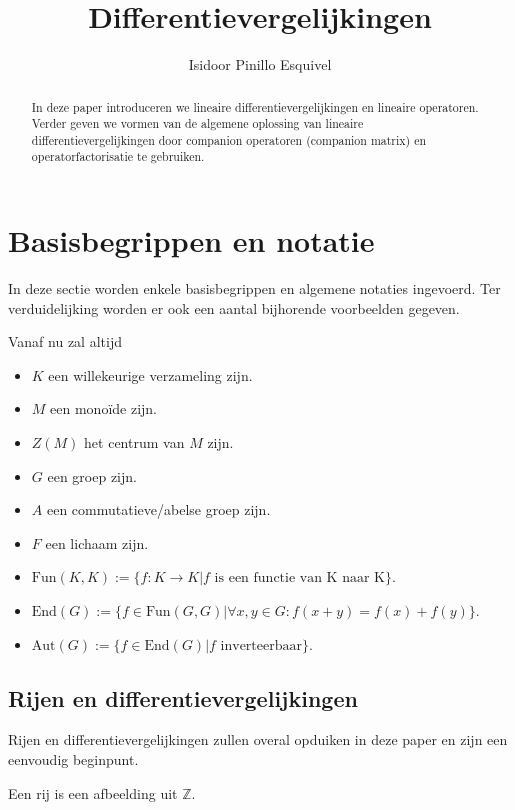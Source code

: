 \documentclass[a4paper,12pt]{article}
\title{Differentievergelijkingen}
\author{Isidoor Pinillo Esquivel}
\begin{document}


\begin{abstract}
    In deze paper introduceren we lineaire differentievergelijkingen en lineaire operatoren.
    Verder geven we vormen van de algemene oplossing van lineaire differentievergelijkingen door
    companion operatoren (companion matrix) en operatorfactorisatie te gebruiken.
\end{abstract}


\section{Basisbegrippen en notatie}
In deze sectie worden enkele basisbegrippen en algemene notaties ingevoerd. Ter verduidelijking worden er ook een aantal bijhorende voorbeelden gegeven.


\begin{notation}
    Vanaf nu zal altijd
    \begin{itemize}
        \item  $K$ een willekeurige verzameling zijn.
        \item  $M$ een monoïde zijn.
        \item  $Z(M)$ het centrum van $M$ zijn.
        \item  $G$ een groep zijn.
        \item  $A$ een commutatieve/abelse groep zijn.
        \item  $F$ een lichaam zijn.
        \item  $\text{Fun}(K,K) := \{f:K \rightarrow K | f \text{ is een functie van K naar K}\}$.
        \item  $\text{End}(G) := \{f \in \text{Fun}(G,G)| \forall x,y \in G: f(x+y)=f(x)+f(y) \}$.
        \item  $\text{Aut}(G) := \{f \in\text{End}(G)| f \text{ inverteerbaar} \}$.
    \end{itemize}
\end{notation}

\subsection{Rijen en differentievergelijkingen}
Rijen en differentievergelijkingen zullen overal opduiken in deze paper en zijn een eenvoudig beginpunt.
\begin{definition}[rij]
    Een rij is een afbeelding uit $\mathbb{Z}$.
\end{definition}
\end{document}
